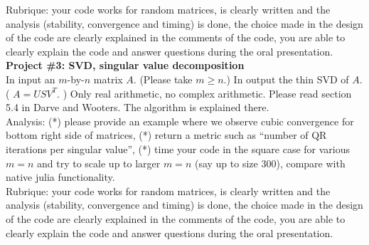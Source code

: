 \documentclass[11pt,letterpaper]{article}
\begin{document}
Rubrique: your code works for random matrices, is clearly written
and the analysis (stability, convergence and timing) is done, the choice made
in the design of the code are clearly explained in the comments of the code, you are able to clearly 
explain the code and answer questions 
during the oral presentation.\\





{\Large \bf Project \#3: SVD, singular value decomposition}\\

In input an $m$-by-$n$ matrix $A$. (Please take $m\geq n$.) In output the thin SVD
of $A$. ( $A = U S V^T$. ) Only real arithmetic, no complex arithmetic. Please
read section 5.4 in Darve and Wooters. The algorithm is explained there.\\

Analysis: (*) please provide an example where we observe cubic convergence for bottom right side of matrices,
(*) return a metric such as ``number of QR iterations per singular value'', (*) time
your code in the square case for various $m=n$ and try to scale up to larger $m=n$
(say up to size $300$), 
compare with native julia functionality.\\

Rubrique: your code works for random matrices, is clearly written and the
analysis (stability, convergence and timing) is done, the choice made in the
design of the code are clearly explained in the comments of the code, you are able to clearly 
explain the code and answer questions 
during the oral presentation.




\end{document}
